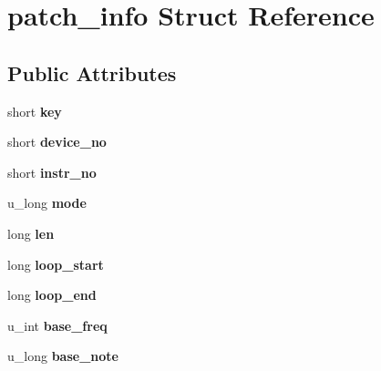 \hypertarget{structpatch__info}{}\section{patch\+\_\+info Struct Reference}
\label{structpatch__info}
\subsection*{Public Attributes}
\begin{DoxyCompactItemize}
\item 
short {\bfseries key}\hypertarget{structpatch__info_a69e99d8e1222f58f4be36270ba136853}{}\label{structpatch__info_a69e99d8e1222f58f4be36270ba136853}

\item 
short {\bfseries device\+\_\+no}\hypertarget{structpatch__info_a149587595ac36c2bc6bfe87468fc9987}{}\label{structpatch__info_a149587595ac36c2bc6bfe87468fc9987}

\item 
short {\bfseries instr\+\_\+no}\hypertarget{structpatch__info_a3353db05f4b977a8964a182ddb5d81b4}{}\label{structpatch__info_a3353db05f4b977a8964a182ddb5d81b4}

\item 
u\+\_\+long {\bfseries mode}\hypertarget{structpatch__info_a46249a328bf2de2f7093b1007344d8e6}{}\label{structpatch__info_a46249a328bf2de2f7093b1007344d8e6}

\item 
long {\bfseries len}\hypertarget{structpatch__info_ab87e0203e0f8265eb5a897a790a6a3b6}{}\label{structpatch__info_ab87e0203e0f8265eb5a897a790a6a3b6}

\item 
long {\bfseries loop\+\_\+start}\hypertarget{structpatch__info_a21673bdc14161f586b27ea4191cc75df}{}\label{structpatch__info_a21673bdc14161f586b27ea4191cc75df}

\item 
long {\bfseries loop\+\_\+end}\hypertarget{structpatch__info_acf0a9a1f100e3658187fe8ead834628b}{}\label{structpatch__info_acf0a9a1f100e3658187fe8ead834628b}

\item 
u\+\_\+int {\bfseries base\+\_\+freq}\hypertarget{structpatch__info_a326a633dddc6a2c22c236a5e68c6c88e}{}\label{structpatch__info_a326a633dddc6a2c22c236a5e68c6c88e}

\item 
u\+\_\+long {\bfseries base\+\_\+note}\hypertarget{structpatch__info_ae19225de386da30b1849c67fcac44d0e}{}\label{structpatch__info_ae19225de386da30b1849c67fcac44d0e}


\end{DoxyCompactItemize}
